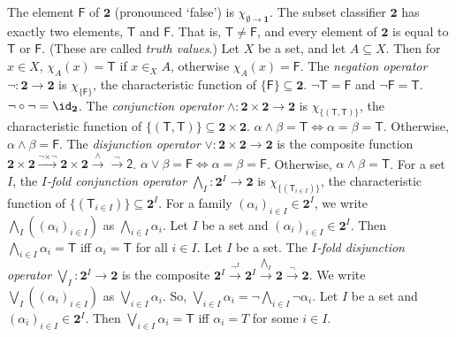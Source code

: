  The element $\mathsf{F}$ of $\mathbf{2}$ (pronounced `false') is $\chi_{\emptyset \to \mathbf{1}}$.
 The subset classifier $\mathbf{2}$ has exactly two elements, $\mathsf{T}$ and $\mathsf{F}$. That is, $\mathsf{T} \neq \mathsf{F}$, and every element of $\mathbf{2}$ is equal to $\mathsf{T}$ or $\mathsf{F}$. (These are called \textit{truth values}.)
 Let $X$ be a set, and let $A \subseteq X$. Then for $x \in X$, $\chi_A(x) = \mathsf{T}$ if $x \in_X A$, otherwise $\chi_A(x) = \mathsf{F}$.
 The \textit{negation operator} $\neg \colon \mathbf{2} \to \mathbf{2}$ is $\chi_{\{\mathsf{F}\}}$, the characteristic function of $\{\mathsf{F}\} \subseteq \mathbf{2}$.
 $\neg \mathsf{T} = \mathsf{F}$ and $\neg \mathsf{F} = \mathsf{T}$.
 $\neg \circ \neg = \id_{\mathbf{2}}$.
 The \textit{conjunction operator} $\wedge \colon \mathbf{2} \times \mathbf{2} \to \mathbf{2}$ is $\chi_{\{(\mathsf{T}, \mathsf{T})\}}$, the characteristic function of $\{(\mathsf{T}, \mathsf{T})\} \subseteq \mathbf{2} \times \mathbf{2}$.
 $\alpha \wedge \beta = \mathsf{T} \iff \alpha = \beta = \mathsf{T}$. Otherwise, $\alpha \wedge \beta = \mathsf{F}$.
 The \textit{disjunction operator} $\vee \colon \mathbf{2} \times \mathbf{2} \to \mathbf{2}$ is the composite function $\mathbf{2} \times \mathbf{2} \xrightarrow{\neg \times \neg} \mathbf{2} \times \mathbf{2} \xrightarrow{\wedge} \xrightarrow{\neg} \mathsf{2}$.
 $\alpha \vee \beta = \mathsf{F} \iff \alpha = \beta = \mathsf{F}$. Otherwise, $\alpha \wedge \beta = \mathsf{T}$.
 For a set $I$, the \textit{$I$-fold conjunction operator} $\bigwedge_I \colon \mathbf{2}^I \to \mathbf{2}$ is $\chi_{\{(\mathsf{T}_{i \in I})\}}$, the characteristic function of $\{(\mathsf{T}_{i \in I})\} \subseteq \mathbf{2}^I$. For a family $(\alpha_i)_{i \in I} \in \mathbf{2}^I$, we write $\bigwedge_I((\alpha_i)_{i \in I})$ as $\bigwedge_{i \in I} \alpha_i$.
 Let $I$ be a set and $(\alpha_i)_{i \in I} \in \mathbf{2}^I$. Then $\bigwedge_{i \in I} \alpha_i = \mathsf{T}$ iff $\alpha_i = \mathsf{T}$ for all $i \in I$.
 Let $I$ be a set. The \textit{$I$-fold disjunction operator} $\bigvee_I \colon \mathbf{2}^I \to \mathbf{2}$ is the composite $\mathbf{2}^I \xrightarrow{\neg^I} \mathbf{2}^I \xrightarrow{\bigwedge_I} \mathbf{2} \xrightarrow{\neg} \mathbf{2}$. We write $\bigvee_I((\alpha_i)_{i \in I})$ as $\bigvee_{i \in I} \alpha_i$. So, $\bigvee_{i \in I} \alpha_i = \neg \bigwedge_{i \in I} \neg \alpha_i$.
 Let $I$ be a set and $(\alpha_i)_{i \in I} \in \mathbf{2}^I$. Then $\bigvee_{i \in I} \alpha_i = \mathsf{T}$ iff $\alpha_i = T$ for some $i \in I$.